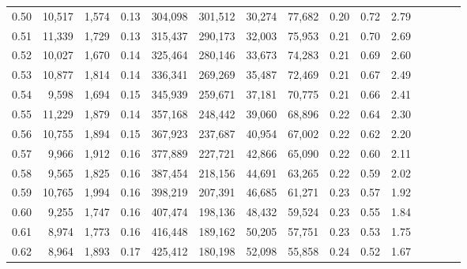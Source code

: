 \begin{tabular}{rrrcrrrrrrrrrrr}
0.50 &  10,517 &  1,574 &                                       0.13 &  304,098 &  301,512 &   30,274 &   77,682 &  0.20 &  0.72 &                         2.79 \\
0.51 &  11,339 &  1,729 &                                       0.13 &  315,437 &  290,173 &   32,003 &   75,953 &  0.21 &  0.70 &                         2.69 \\
0.52 &  10,027 &  1,670 &                                       0.14 &  325,464 &  280,146 &   33,673 &   74,283 &  0.21 &  0.69 &                         2.60 \\
0.53 &  10,877 &  1,814 &                                       0.14 &  336,341 &  269,269 &   35,487 &   72,469 &  0.21 &  0.67 &                         2.49 \\
0.54 &   9,598 &  1,694 &                                       0.15 &  345,939 &  259,671 &   37,181 &   70,775 &  0.21 &  0.66 &                         2.41 \\
0.55 &  11,229 &  1,879 &                                       0.14 &  357,168 &  248,442 &   39,060 &   68,896 &  0.22 &  0.64 &                         2.30 \\
0.56 &  10,755 &  1,894 &                                       0.15 &  367,923 &  237,687 &   40,954 &   67,002 &  0.22 &  0.62 &                         2.20 \\
0.57 &   9,966 &  1,912 &                                       0.16 &  377,889 &  227,721 &   42,866 &   65,090 &  0.22 &  0.60 &                         2.11 \\
0.58 &   9,565 &  1,825 &                                       0.16 &  387,454 &  218,156 &   44,691 &   63,265 &  0.22 &  0.59 &                         2.02 \\
0.59 &  10,765 &  1,994 &                                       0.16 &  398,219 &  207,391 &   46,685 &   61,271 &  0.23 &  0.57 &                         1.92 \\
0.60 &   9,255 &  1,747 &                                       0.16 &  407,474 &  198,136 &   48,432 &   59,524 &  0.23 &  0.55 &                         1.84 \\
0.61 &   8,974 &  1,773 &                                       0.16 &  416,448 &  189,162 &   50,205 &   57,751 &  0.23 &  0.53 &                         1.75 \\
0.62 &   8,964 &  1,893 &                                       0.17 &  425,412 &  180,198 &   52,098 &   55,858 &  0.24 &  0.52 &                         1.67 \\

\end{tabular}
